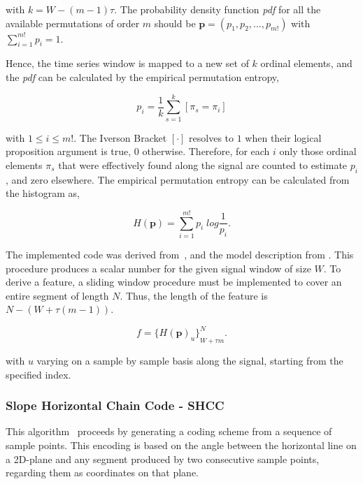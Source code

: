 \noindent with $k = W-(m-1) \tau$.  The probability density function \textit{pdf} for all the available permutations of order $m$ should be $ \textbf{p} = (p_1,p_2,...,p_{m!}) $ with $ \sum_{i=1}^{m!} p_{i} = 1 $.

Hence, the time series window is mapped to a new set of $k$ ordinal elements, and the \textit{pdf} can be calculated by the empirical permutation entropy,

\begin{equation}
p_i = \frac{1}{k} \sum_{s=1}^{k} \left[ \pi_{s} = \pi_{i} \right]
\label{eq:pe4}
\end{equation}

\noindent with $1 \leq i \leq m!$. The Iverson Bracket $ \left[ \cdot \right] $ resolves to $1$ when their logical proposition argument is true, $0$ otherwise. Therefore, for each $i$ only those ordinal elements $\pi_{s}$ that were effectively found along the signal are counted to estimate $p_i$, and zero elsewhere.  The empirical permutation entropy can be calculated from the histogram as,

\begin{equation}
H(\textbf{p}) = \sum_{i=1}^{m!} p_{i} \; log \frac{1}{p_{i}}.
\label{eq:pe5}
\end{equation}

The implemented code was derived from~\cite{Unakafova2013}, and the model description from \cite{Berger2017}.  This procedure produces a scalar number for the given signal window of size $W$.  To derive a feature, a sliding window procedure must be implemented to cover an entire segment of length $N$.  Thus, the length of the feature is $N - (W + \tau (m - 1))$.

\begin{equation}
f =  {\bigg \{ H(\textbf{p})_{u} \bigg \}}_{W + \tau  m}^{N}.
\label{eq:pe6}
\end{equation}

\noindent with $u$ varying on a sample by sample basis along the signal, starting from the specified index.

\subsubsection{Slope Horizontal Chain Code - SHCC}

This algorithm~\cite{Alvarado-Gonzalez2016} proceeds by generating a coding scheme from a sequence of sample points. This encoding is based on the angle between the horizontal line on a 2D-plane and any segment produced by two consecutive sample points, regarding them as coordinates on that plane.  

